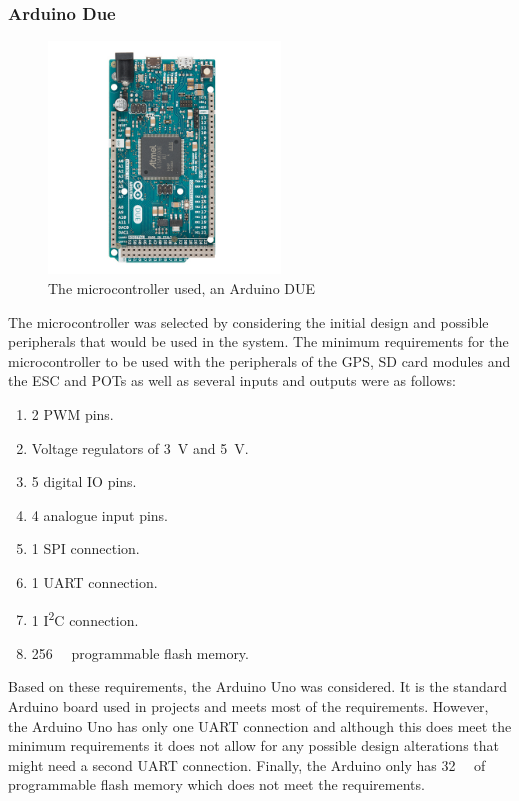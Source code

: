 		\subsubsection{Arduino Due}\par
		\begin{figure}[!ht]
			\begin{center}
				\includegraphics[width = 0.55\textwidth]{figures/DUE.jpg}
				\caption{The microcontroller used, an Arduino DUE}
				\label{fig:3:due}
			\end{center}
		\end{figure}
		The microcontroller was selected by considering the initial design and possible peripherals that would be used in the system. The minimum requirements for the microcontroller to be used with the peripherals of the GPS, SD card modules and the ESC and POTs as well as several inputs and outputs were as follows:
		\begin{enumerate}
			\item 2 PWM pins.
			\item Voltage regulators of \SI{3}{\volt} and \SI{5}{\volt}.
			\item 5 digital IO pins.
			\item 4 analogue input pins.
			\item 1 SPI connection.
			\item 1 UART connection.
			\item 1 I\textsuperscript{2}C connection.
			\item \SI{256}{\kilo\byte} programmable flash memory.		
		\end{enumerate}
		Based on these requirements, the Arduino Uno was considered. It is the standard Arduino board used in projects and meets most of the requirements. However, the Arduino Uno has only one UART connection and although this does meet the minimum requirements it does not allow for any possible design alterations that might need a second UART connection. Finally, the Arduino only has \SI{32}{\kilo\byte} of programmable flash memory which does not meet the requirements.\par 

